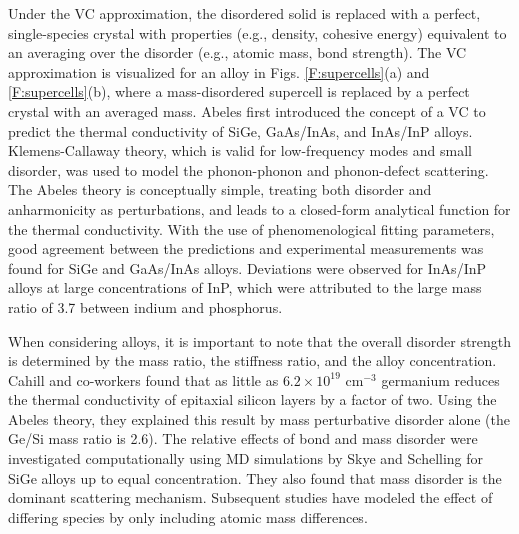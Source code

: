 Under the VC approximation, the disordered solid is replaced with 
a perfect, single-species crystal with properties (e.g., density, 
cohesive energy) equivalent to an averaging over the disorder 
(e.g., atomic mass, bond strength).\cite{abeles_lattice_1963}
The VC approximation is visualized for an alloy in Figs. 
\ref{F:supercells}(a) and \ref{F:supercells}(b), where 
a mass-disordered supercell is replaced by a perfect 
crystal with an averaged mass. 
Abeles first introduced the concept of a VC to predict the
thermal conductivity of SiGe, GaAs/InAs, and InAs/InP alloys.
\cite{abeles_lattice_1963} Klemens-Callaway theory, 
which is valid for low-frequency modes and small disorder, was used to 
model the phonon-phonon and phonon-defect scattering.
\cite{abeles_lattice_1963,klemens_scattering_1955,klemens_thermal_1957,
callaway_model_1959,mattis_phonon_1957,kamitakahara_vibrations_1974} 
The Abeles theory is conceptually simple, treating both
disorder and anharmonicity as perturbations, and leads to 
a closed-form analytical function for the thermal conductivity.
With the use of phenomenological  
fitting parameters, good agreement between the predictions and 
experimental measurements 
was found for SiGe and GaAs/InAs alloys. Deviations were observed 
for InAs/InP alloys at large concentrations of 
InP, which were attributed to the large mass ratio of 3.7 between 
indium and phosphorus.\cite{abeles_lattice_1963}

When considering alloys, it is important to note that 
the overall disorder strength is determined by the mass ratio, 
the stiffness ratio, and the alloy concentration.
Cahill and co-workers found that as little as 
$6.2\times10^{19}$ cm$^{-3}$ germanium reduces the thermal conductivity 
of epitaxial silicon layers by a factor of two.
\cite{cahill_thermal_2004}  
Using the Abeles theory, they explained this result 
by mass perturbative disorder alone (the Ge/Si mass ratio is 2.6).
\cite{cahill_thermal_2004,cahill_thermal_2005} 
The relative effects of bond and mass disorder were investigated 
computationally using MD simulations by Skye and 
Schelling for SiGe alloys up to equal concentration.
\cite{skye_thermal_2008} They also found that mass disorder is 
the dominant scattering mechanism. Subsequent studies have modeled the 
effect of differing species by only including 
atomic mass differences.\cite{landry_thermal_2009,tian_enhancing_2012}

